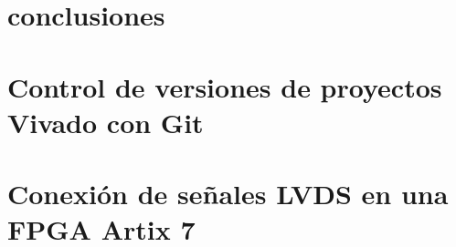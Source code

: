 \documentclass[11pt,letterpaper,oneside]{phstylee}
\begin{document}

\chapter{conclusiones}
\label{cap:conclusiones}
%

\newpage
\thispagestyle{empty}
\cleardoublepage



\appendix
\chapter{Control de versiones de proyectos Vivado con Git}
\label{cap:git}
%

\chapter{Conexión de señales LVDS en una FPGA Artix 7}
\label{cap:lvds}
%

%
%
%



\end{document}
